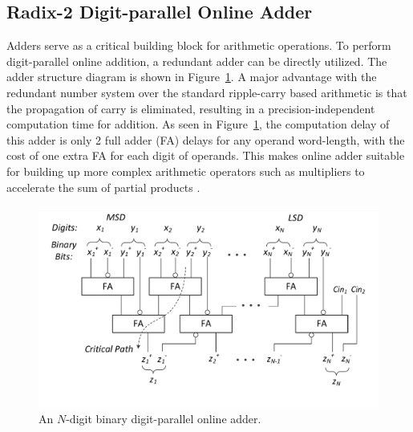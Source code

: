 \documentclass{acm_proc_article-sp}
\begin{document}
\subsection{Radix-2 Digit-parallel Online Adder}\label{subsec:OnlineAdder}
Adders serve as a critical building block for arithmetic operations. To perform digit-parallel online addition, a redundant adder can be directly utilized. The adder structure diagram is shown in Figure~\ref{Fig:Radix2SD_adder}. A major advantage with the redundant number system over the standard ripple-carry based arithmetic is that the propagation of carry is eliminated, resulting in a precision-independent computation time for addition. As seen in Figure~\ref{Fig:Radix2SD_adder}, the computation delay of this adder is only 2 full adder (FA) delays for any operand word-length, with the cost of one extra FA for each digit of operands. This makes online adder suitable for building up more complex arithmetic operators such as multipliers to accelerate the sum of partial products \cite{RedundantMult_1987,RedundantMult_1985}.
%
%
\begin{figure}
\includegraphics[width=.5\textwidth]{./Figures/SDAdder.pdf}
\vspace{-8.5ex}
\caption{An $N$-digit binary digit-parallel online adder.}
\label{Fig:Radix2SD_adder}
\end{figure}

\end{document}
